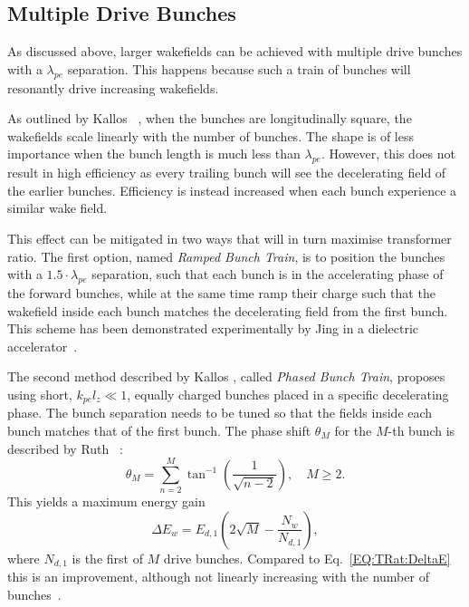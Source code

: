 \subsection{Multiple Drive Bunches}
\label{Int:BPI:Multi}

As discussed above, larger wakefields can be achieved with multiple drive bunches with a $\lambda_{pe}$ separation.
This happens because such a train of bunches will resonantly drive increasing wakefields.

As outlined by Kallos \etal~\cite{kallos:2007}, when the bunches are longitudinally square, the wakefields scale linearly with the number of bunches.
The shape is of less importance when the bunch length is much less than $\lambda_{pe}$.
However, this does not result in high efficiency as every trailing bunch will see the decelerating field of the earlier bunches.
Efficiency is instead increased when each bunch experience a similar wake field.

This effect can be mitigated in two ways that will in turn maximise transformer ratio.
The first option, named \textit{Ramped Bunch Train}, is to position the bunches with a $1.5\cdot\lambda_{pe}$ separation, such that each bunch is in the accelerating phase of the forward bunches, while at the same time ramp their charge such that the wakefield inside each bunch matches the decelerating field from the first bunch.
This scheme has been demonstrated experimentally by Jing \etal in a dielectric accelerator~\cite{jing:2006,jing:2007}.

The second method described by Kallos \etal, called \textit{Phased Bunch Train}, proposes using short, $k_{pe}l_{z} \ll 1$, equally charged bunches placed in a specific decelerating phase.
The bunch separation needs to be tuned so that the fields inside each bunch matches that of the first bunch.
The phase shift $\theta_{M}$ for the $M$-th bunch is described by Ruth \etal~\cite{ruth:1985}:
\begin{equation}
    \theta_{M} = \sum^{M}_{n=2}\tan^{-1}\left(\frac{1}{\sqrt{n-2}}\right),\quad M \geq 2. \label{EQ:TrainPhase}
\end{equation}
This yields a maximum energy gain
\begin{equation}
    \Delta E_{w} = E_{d,1}\left(2\sqrt{M}-\frac{N_{w}}{N_{d,1}}\right), \label{EQ:TrainPhaseMaxE}
\end{equation}
where $N_{d,1}$ is the first of $M$ drive bunches.
Compared to Eq.~\ref{EQ:TRat:DeltaE} this is an improvement, although not linearly increasing with the number of bunches~\cite{ruth:1985}.

